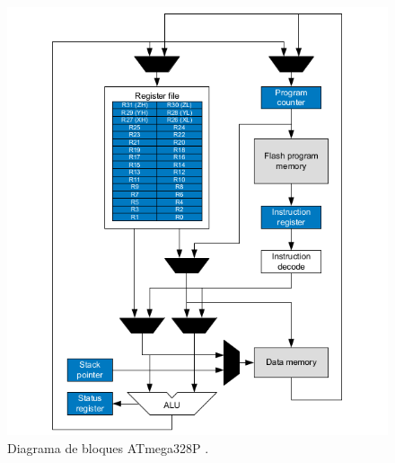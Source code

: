 \begin{figure}[H]
\centering
\includegraphics[scale=0.75]{./images/bloques.png} 
\caption{Diagrama de bloques ATmega328P \cite{mcu}.  }
\label{f1}
\end{figure}



